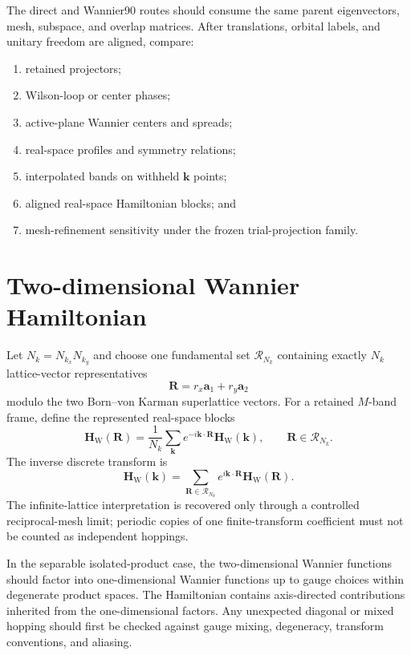 The direct and Wannier90 routes should consume the same parent eigenvectors,
mesh, subspace, and overlap matrices. After translations, orbital labels, and
unitary freedom are aligned, compare:
\begin{enumerate}
    \item retained projectors;
    \item Wilson-loop or center phases;
    \item active-plane Wannier centers and spreads;
    \item real-space profiles and symmetry relations;
    \item interpolated bands on withheld $\mathbf k$ points;
    \item aligned real-space Hamiltonian blocks; and
    \item mesh-refinement sensitivity under the frozen trial-projection family.
\end{enumerate}

\section{Two-dimensional Wannier Hamiltonian}

Let $N_k=N_{k_x}N_{k_y}$ and choose one fundamental set
$\mathcal R_{N_k}$ containing exactly $N_k$ lattice-vector representatives
\begin{equation}
    \mathbf R=r_x\mathbf a_1+r_y\mathbf a_2
\end{equation}
modulo the two Born--von Karman superlattice vectors. For a retained $M$-band
frame, define the represented real-space blocks
\begin{equation}
    \mathbf H_{\mathrm W}(\mathbf R)
    =
    \frac{1}{N_k}
    \sum_{\mathbf k}
    e^{-i\mathbf k\cdot\mathbf R}
    \mathbf H_{\mathrm W}(\mathbf k),
    \qquad
    \mathbf R\in\mathcal R_{N_k}.
\end{equation}
The inverse discrete transform is
\begin{equation}
    \mathbf H_{\mathrm W}(\mathbf k)
    =
    \sum_{\mathbf R\in\mathcal R_{N_k}}
    e^{i\mathbf k\cdot\mathbf R}
    \mathbf H_{\mathrm W}(\mathbf R).
\end{equation}
The infinite-lattice interpretation is recovered only through a controlled
reciprocal-mesh limit; periodic copies of one finite-transform coefficient must
not be counted as independent hoppings.

In the separable isolated-product case, the two-dimensional Wannier functions
should factor into one-dimensional Wannier functions up to gauge choices within
degenerate product spaces. The Hamiltonian contains axis-directed contributions
inherited from the one-dimensional factors. Any unexpected diagonal or mixed
hopping should first be checked against gauge mixing, degeneracy, transform
conventions, and aliasing.

